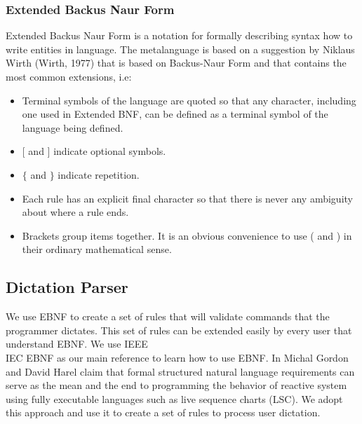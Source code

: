 \subsubsection{Extended Backus Naur Form}
Extended Backus Naur Form is a notation for formally describing syntax how to write entities in language. The metalanguage is based on a suggestion by Niklaus Wirth (Wirth, 1977) that is based on Backus-Naur Form and that contains the most common extensions, i.e:
\begin{itemize}
	\item Terminal symbols of the language are quoted so that any character,
	including one used in Extended BNF, can be defined as a terminal symbol of
	the language being defined.
	\item $ [ $ and $ ] $ indicate optional symbols.
	\item $ \{ $ and $ \} $ indicate repetition.
	\item Each rule has an explicit final character so that there is never any
	ambiguity about where a rule ends.
	\item Brackets group items together. It is an obvious convenience to use ( and ) in their ordinary mathematical sense.
\end{itemize}
\subsection{Dictation Parser} \label{subsec: Dictation Parser}
We use EBNF to create a set of rules that will validate commands that the programmer dictates. This set of rules can be extended easily by every user that understand EBNF. We use IEEE\\IEC EBNF \cite{IEEEBNF1996} as our main reference to learn how to use EBNF. In \cite[pages 51-86]{Michal2009} Michal Gordon and David Harel claim that formal structured natural language requirements can serve as the mean and the end to programming the behavior of reactive system using fully executable languages such as live sequence charts (LSC). We adopt this approach and use it to create a set of rules to process user dictation.

